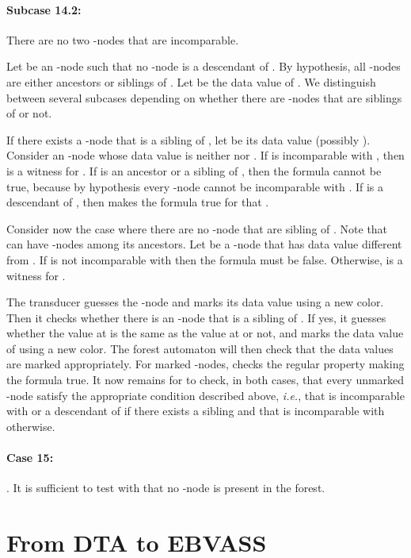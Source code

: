 \documentclass{CSML}
\newcommand\ebvass{\textup{EBVASS}\xspace}
\newcommand\dad{\textup{DTA}\xspace}
\begin{document}
\paragraph{\bf Subcase 14.2:} There are no two -nodes that are incomparable. 

Let  be an -node such that no -node is
a descendant of . By hypothesis, all -nodes are either ancestors
or siblings of . Let  be the data value of .
We distinguish between several subcases depending on whether there are -nodes
that are siblings of  or not.

If there exists a -node  that is a sibling of , 
let  be its data value (possibly ).
Consider an -node  whose data value is neither  nor .
If  is incomparable with , then  is a witness for . 
If  is an ancestor or a sibling of , 
then the formula cannot be true, because by hypothesis
every -node cannot be incomparable with .
If  is a descendant of , then  makes the formula true for that .

Consider now the case where there are no -node that are sibling of .
Note that  can have -nodes among its ancestors.
Let  be a -node that has data value different from . 
If  is not incomparable with  then the formula must be false. 
Otherwise,  is a witness for .

The transducer  guesses the -node  and marks its data value using a new color. 
Then it checks whether there is an -node  that is a sibling of .
If yes, it guesses whether the value at  is the same as the value at  or not,
and marks the data value of  using a new color.
The forest automaton  will then check that the data values are marked appropriately.
For marked -nodes,  checks the regular property making the formula true.
It now remains for  to check, in both cases, 
that every unmarked -node 
satisfy the appropriate condition described above,
\textit{i.e.},
 that  is incomparable with  or a descendant of  
 if there exists a sibling  
 and that  is incomparable with  otherwise.

\paragraph{\bf Case 15:}
. 
It is sufficient to test with  that no -node is present in the forest.


\section{From \texorpdfstring{\dad}{DTA} to \texorpdfstring{\ebvass}{EBVASS}}\label{sec-dad-counter}
\end{document}

